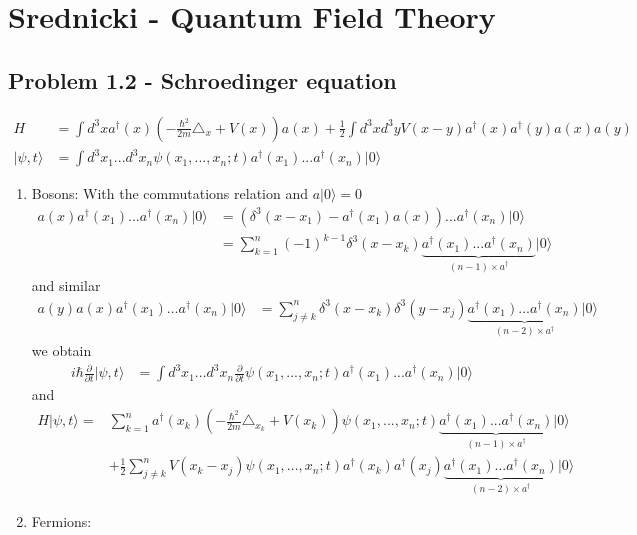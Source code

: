 \documentclass[10pt,a4paper]{book}
\theoremstyle{definition}
\begin{document}
\section{{\sc Srednicki} - Quantum Field Theory}
\subsection{Problem 1.2 - Schroedinger equation}
\begin{align}
    H&=\int d^3x a^\dagger(x)\left(-\frac{\hbar^2}{2m}\triangle_x+V(x)\right)a(x)+\frac{1}{2}\int d^3xd^3yV(x-y)a^\dagger(x)a^\dagger(y)a(x)a(y)\\
    |\psi,t\rangle&=\int d^3x_1...d^3x_n\psi(x_1,...,x_n;t)a^\dagger(x_1)...a^\dagger(x_n)|0\rangle
\end{align}
\begin{enumerate}
    \item Bosons:
    With the commutations relation and $a|0\rangle=0$
    \begin{align}
        a(x)a^\dagger(x_1)...a^\dagger(x_n)|0\rangle
        &=\left(\delta^3(x-x_1)-a^\dagger(x_1)a(x)\right)...a^\dagger(x_n)|0\rangle\\
        &=\sum_{k=1}^n(-1)^{k-1} \delta^3(x-x_k)\underbrace{a^\dagger(x_1)...a^\dagger(x_n)}_{(n-1) \times a^\dagger}|0\rangle
    \end{align}
    and similar
    \begin{align}
        a(y)a(x)a^\dagger(x_1)...a^\dagger(x_n)|0\rangle
        &=\sum_{j\neq k}^n \delta^3(x-x_k)\delta^3(y-x_j)\underbrace{a^\dagger(x_1)...a^\dagger(x_n)}_{(n-2) \times a^\dagger}|0\rangle
    \end{align}
    we obtain
	\begin{align}
		i\hbar\frac{\partial}{\partial t}|\psi,t\rangle
		&=\int d^3x_1...d^3x_n\frac{\partial}{\partial t}\psi(x_1,...,x_n;t)a^\dagger(x_1)...a^\dagger(x_n)|0\rangle 
	\end{align}
    and
    \begin{align}
        H|\psi,t\rangle=&\sum_{k=1}^na^\dagger(x_k)\left(-\frac{\hbar^2}{2m}\triangle_{x_k}+V(x_k)\right)\psi(x_1,...,x_n;t)\underbrace{a^\dagger(x_1)...a^\dagger(x_n)}_{(n-1) \times a^\dagger}|0\rangle\\
        &+\frac{1}{2}\sum_{j\neq k}^nV(x_k-x_j)\psi(x_1,...,x_n;t)a^\dagger(x_k)a^\dagger(x_j)\underbrace{a^\dagger(x_1)...a^\dagger(x_n)}_{(n-2) \times a^\dagger}|0\rangle
    \end{align}
    \item Fermions:
\end{enumerate}
\end{document}

